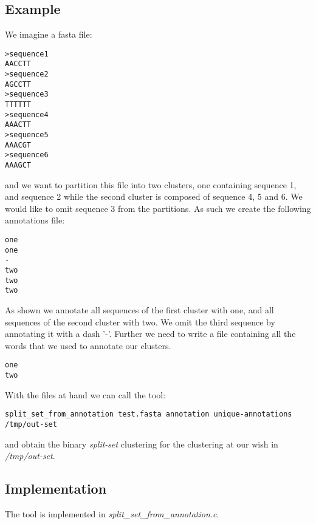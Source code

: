 \subsection{Example}
We imagine a fasta file:
\begin{lstlisting}
>sequence1
AACCTT
>sequence2
AGCCTT
>sequence3
TTTTTT
>sequence4
AAACTT
>sequence5
AAACGT
>sequence6
AAAGCT
\end{lstlisting}
and we want to partition this file into two clusters, one containing
sequence 1, and sequence 2 while the second cluster is composed of
sequence 4, 5 and 6. We would like to omit sequence 3 from the
partitions. As such we create the following annotations file:
\begin{lstlisting}
one
one
-
two
two
two
\end{lstlisting}
As shown we annotate all sequences of the first cluster with one, and
all sequences of the second cluster with two. We omit the third
sequence by annotating it with a dash '-'. Further we need to write a
file containing all the words that we used to annotate our clusters.
\begin{lstlisting}
one
two
\end{lstlisting}
With the files at hand we can call the tool:
\begin{lstlisting}
split_set_from_annotation test.fasta annotation unique-annotations /tmp/out-set
\end{lstlisting}
and obtain the binary \emph{split-set} clustering for the clustering
at our wish in \emph{/tmp/out-set}.

\subsection{Implementation}
The tool is implemented in \emph{split\_set\_from\_annotation.c}.
